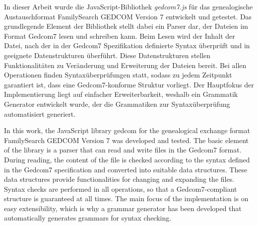 \kurzfassung
In dieser Arbeit wurde die JavaScript-Bibliothek \textit{gedcom7.js} für das genealogische Austauschformat FamilySearch GEDCOM Version 7 entwickelt und getestet. Das grundlegende Element der Bibliothek stellt dabei ein Parser dar, der Dateien im Format Gedcom7 lesen und schreiben kann. Beim Lesen wird der Inhalt der Datei, nach der in der Gedcom7 Spezifikation definierte Syntax überprüft und in geeignete Datenstrukturen überführt. Diese Datenstrukturen stellen Funktionalitäten zu Veränderung und Erweiterung der Dateien bereit. Bei allen Operationen finden Syntaxüberprüfungen statt, sodass zu jedem Zeitpunkt garantiert ist, dass eine Gedcom7-konforme Struktur vorliegt. Der Hauptfokus der Implementierung liegt auf einfacher Erweiterbarkeit, weshalb ein Grammatik Generator entwickelt wurde, der die Grammatiken zur Syntaxüberprüfung automatisiert generiert.

\kurzfassungEN
In this work, the JavaScript library  gedcom for the genealogical exchange format FamilySearch GEDCOM Version 7 was developed and tested. The basic element of the library is a parser that can read and write files in the Gedcom7 format. During reading, the content of the file is checked according to the syntax defined in the Gedcom7 specification and converted into suitable data structures. These data structures provide functionalities for changing and expanding the files. Syntax checks are performed in all operations, so that a Gedcom7-compliant structure is guaranteed at all times. The main focus of the implementation is on easy extensibility, which is why a grammar generator has been developed that automatically generates grammars for syntax checking.
